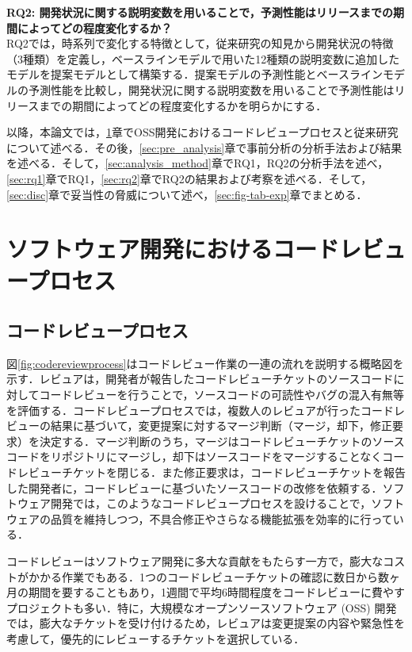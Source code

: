 \documentclass[11pt]{jreport}
\newcommand{\rqtwo}{開発状況に関する説明変数を用いることで，予測性能はリリースまでの期間によってどの程度変化するか？}
\begin{document}
\noindent\textbf{RQ2: \rqtwo}\\
RQ2では，時系列で変化する特徴として，従来研究\cite{integrator}\cite{release_merge}の知見から開発状況の特徴（3種類）を定義し，ベースラインモデルで用いた12種類の説明変数に追加したモデルを提案モデルとして構築する．提案モデルの予測性能とベースラインモデルの予測性能を比較し，開発状況に関する説明変数を用いることで予測性能はリリースまでの期間によってどの程度変化するかを明らかにする．

以降，本論文では，\ref{sec:intro}章でOSS開発におけるコードレビュープロセスと従来研究について述べる．その後，\ref{sec:pre_analysis}章で事前分析の分析手法および結果を述べる．そして，\ref{sec:analysis_method}章でRQ1，RQ2の分析手法を述べ，\ref{sec:rq1}章でRQ1，\ref{sec:rq2}章でRQ2の結果および考察を述べる．そして，\ref{sec:disc}章で妥当性の脅威について述べ，\ref{sec:fig-tab-exp}章でまとめる．

\chapter{ソフトウェア開発におけるコードレビュープロセス}\label{sec:intro}

\section{コードレビュープロセス}
図\ref{fig:codereviewprocess}はコードレビュー作業の一連の流れを説明する概略図を示す．レビュアは，開発者が報告したコードレビューチケットのソースコードに対してコードレビューを行うことで，ソースコードの可読性やバグの混入有無等を評価する．コードレビュープロセスでは，複数人のレビュアが行ったコードレビューの結果に基づいて，変更提案に対するマージ判断（マージ，却下，修正要求）を決定する．マージ判断のうち，マージはコードレビューチケットのソースコードをリポジトリにマージし，却下はソースコードをマージすることなくコードレビューチケットを閉じる．また修正要求は，コードレビューチケットを報告した開発者に，コードレビューに基づいたソースコードの改修を依頼する．ソフトウェア開発では，このようなコードレビュープロセスを設けることで，ソフトウェアの品質を維持しつつ，不具合修正やさらなる機能拡張を効率的に行っている．

コードレビューはソフトウェア開発に多大な貢献をもたらす一方で，膨大なコストがかかる作業でもある．1つのコードレビューチケットの確認に数日から数ヶ月の期間を要することもあり，1週間で平均6時間程度をコードレビューに費やすプロジェクトも多い\cite{review2}．特に，大規模なオープンソースソフトウェア (OSS) 開発では，膨大なチケットを受け付けるため，レビュアは変更提案の内容や緊急性を考慮して，優先的にレビューするチケットを選択している\cite{integrator}．
\end{document}
